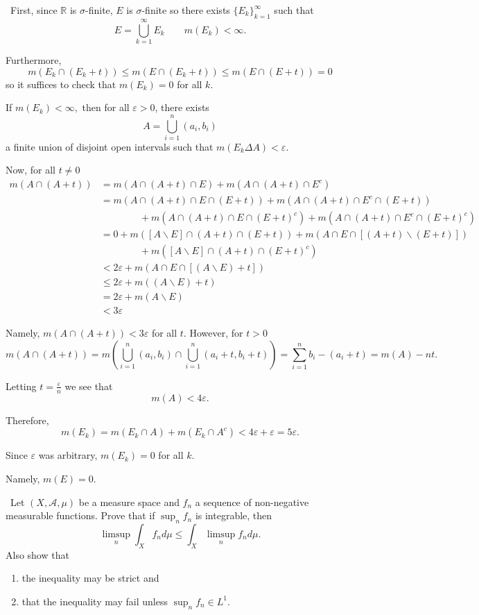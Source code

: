 \documentclass[12pt]{Homework}
\begin{document}
\begin{solution}$\,$
First, since $\mathbb{R}$ is $\sigma$-finite, $E$ is $\sigma$-finite so there exists $\{E_k\}_{k=1}^\infty$ such that $$E=\bigcup_{k=1}^\infty E_k\qquad m(E_k)<\infty.$$

Furthermore, $$m(E_k\cap (E_k+t))\le m(E\cap (E_k+t))\le m(E\cap (E+t))=0$$ so it suffices to check that $m(E_k)=0$ for all $k.$

If $m(E_k)<\infty,$ then for all $\varepsilon>0$, there exists $$A=\bigcup_{i=1}^n(a_i,b_i)$$ a finite union of disjoint open intervals such that $m(E_k\Delta A)<\varepsilon.$

Now, for all $t\not=0$ \begin{align*}
    m(A\cap(A+t))&=m(A\cap (A+t)\cap E)+m(A\cap( A+t)\cap E^c)\\
    &=m(A\cap (A+t)\cap E\cap (E+t))+m(A\cap( A+t)\cap E^c\cap (E+t))\\
    &\qquad\qquad +m(A\cap (A+t)\cap E\cap(E+t)^c)+m(A\cap( A+t)\cap E^c\cap(E+t)^c)\\
    &=0+m([A\backslash E]\cap (A+t)\cap (E+t))+m(A\cap E\cap [(A+t)\backslash(E+t)])\\
    &\qquad\qquad+m([A\backslash E]\cap(A+t)\cap (E+t)^c)\\
    &<2\varepsilon+m(A\cap E\cap [(A\backslash E)+t])\\
    &\le 2\varepsilon+m((A\backslash E)+t)\\
    &=2\varepsilon+m(A\backslash E)\\
    &<3\varepsilon
\end{align*}

Namely, $m(A\cap (A+t))<3\varepsilon$ for all $t.$ However, for $t>0$ $$m(A\cap (A+t))=m\left(\bigcup_{i=1}^n(a_i,b_i)\cap\bigcup_{i=1}^n(a_i+t,b_i+t)\right)=\sum_{i=1}^nb_i-(a_i+t)=m(A)-nt.$$

Letting $t=\frac{\varepsilon}{n}$ we see that $$m(A)<4\varepsilon.$$

Therefore, $$m(E_k)=m(E_k\cap A)+m(E_k\cap A^c)<4\varepsilon+\varepsilon=5\varepsilon.$$

Since $\varepsilon$ was arbitrary, $m(E_k)=0$ for all $k.$

Namely, $m(E)=0.$
\end{solution}
\newpage



\begin{problem} $\,$
Let $(X,\mathscr{A},\mu)$ be a measure space and $f_n$ a sequence of non-negative measurable functions. Prove that if $\sup_nf_n$ is integrable, then $$\limsup_n\int_Xf_nd\mu\le\int_X\limsup_nf_nd\mu.$$ Also show that \begin{enumerate}[label=(\alph*)]
    \item the inequality may be strict and
    \item that the inequality may fail unless $\sup_nf_n\in L^1.$
\end{enumerate}
\end{problem}
\end{document}
